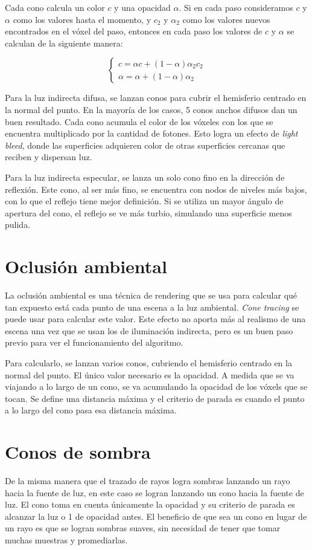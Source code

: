 Cada cono calcula un color $c$ y una opacidad $\alpha$.
Si en cada paso consideramos $c$ y $\alpha$ como los valores hasta el momento, y $c_2$ y $\alpha_2$ como los valores nuevos encontrados en el vóxel del paso, entonces en cada paso los valores de $c$ y $\alpha$ se calculan de la siguiente manera:

$$
\begin{cases}
    c = \alpha c + (1 - \alpha) \alpha_2 c_2 \\
    \alpha = \alpha + (1 - \alpha) \alpha_2
\end{cases}
$$

Para la luz indirecta difusa, se lanzan conos para cubrir el hemisferio centrado en la normal del punto.
En la mayoría de los casos, 5 conos anchos difusos dan un buen resultado.
Cada cono acumula el color de los vóxeles con los que se encuentra multiplicado por la cantidad de fotones.
Esto logra un efecto de \textit{light bleed}, donde las superficies adquieren color de otras superficies cercanas que reciben y dispersan luz.

Para la luz indirecta especular, se lanza un solo cono fino en la dirección de reflexión.
Este cono, al ser más fino, se encuentra con nodos de niveles más bajos, con lo que el reflejo tiene mejor definición.
Si se utiliza un mayor ángulo de apertura del cono, el reflejo se ve más turbio, simulando una superficie menos pulida.

\section{Oclusión ambiental}

La oclusión ambiental es una técnica de rendering que se usa para calcular qué tan expuesto está cada punto de una escena a la luz ambiental.
\textit{Cone tracing} se puede usar para calcular este valor.
Este efecto no aporta más al realismo de una escena una vez que se usan los de iluminación indirecta, pero es un buen paso previo para ver el funcionamiento del algoritmo.

Para calcularlo, se lanzan varios conos, cubriendo el hemisferio centrado en la normal del punto.
El único valor necesario es la opacidad.
A medida que se va viajando a lo largo de un cono, se va acumulando la opacidad de los vóxels que se tocan.
Se define una distancia máxima y el criterio de parada es cuando el punto a lo largo del cono pasa esa distancia máxima.

\section{Conos de sombra}

De la misma manera que el trazado de rayos logra sombras lanzando un rayo hacia la fuente de luz, en este caso se logran lanzando un cono hacia la fuente de luz.
El cono toma en cuenta únicamente la opacidad y su criterio de parada es alcanzar la luz o 1 de opacidad antes.
El beneficio de que sea un cono en lugar de un rayo es que se logran sombras suaves, sin necesidad de tener que tomar muchas muestras y promediarlas.

